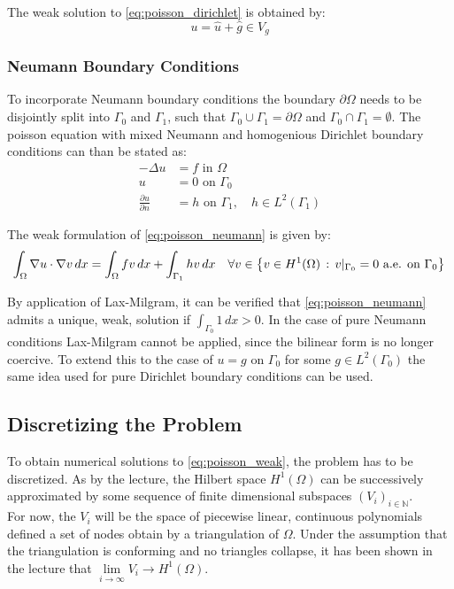 \documentclass[11pt,a4paper]{article}
\begin{document}
The weak solution to \ref{eq:poisson_dirichlet} is obtained by:
$$u = \hat{u} + \hat{g} \in V_g$$

\subsubsection*{Neumann Boundary Conditions}
To incorporate Neumann boundary conditions the boundary $\partial\Omega$ needs
to be disjointly split into $\Gamma_0$ and $\Gamma_1$, such that
$\Gamma_0 \cup \Gamma_1 = \partial\Omega$ and $\Gamma_0 \cap \Gamma_1 = \emptyset$.
The poisson equation with mixed Neumann and homogenious Dirichlet boundary
conditions can than be stated as:
\begin{equation} \label{eq:poisson_neumann}
  \begin{split}
    -\Delta u &= f  \text{ in } \Omega \\
    u &= 0 \text{ on } \Gamma_0 \\
    \frac{\partial u}{\partial n} &= h \text{ on } \Gamma_1, \quad h\in L^2(\Gamma_1)
  \end{split}
\end{equation}

The weak formulation of \ref{eq:poisson_neumann} is given by:
\begin{equation}
  \int_\Omega \nabla u \cdot \nabla v\,dx
  = \int_\Omega fv\,dx + \int_{\Gamma_1}hv\,dx \quad
  \forall v \in \left\{ v \in H^1(\Omega)\, :\, v\vert_{\Gamma_0} = 0 \text{ a.e. on } \Gamma_0\right\}\\
\end{equation}

By application of Lax-Milgram, it can be verified that \ref{eq:poisson_neumann}
admits a unique, weak, solution if $\int_{\Gamma_0}1\,dx > 0$.
In the case of pure Neumann conditions Lax-Milgram cannot be applied, since the
bilinear form is no longer coercive. To extend this to the case of $u = g$ on
$\Gamma_0$ for some $g \in L^2(\Gamma_0)$ the same idea used for pure Dirichlet
boundary conditions can be used.

\subsection*{Discretizing the Problem}
To obtain numerical solutions to \ref{eq:poisson_weak}, the problem has to be
discretized. As by the lecture, the Hilbert space $H^1(\Omega)$ can be
successively approximated by some sequence of finite dimensional subspaces
$(V_i)_{i\in \mathbb{N}}$.\\
For now, the $V_i$ will be the space of piecewise linear, continuous
polynomials defined a set of nodes obtain by a triangulation of $\Omega$.
Under the assumption that the triangulation is conforming and no triangles
collapse, it has been shown in the lecture that $\lim\limits_{i\to\infty}V_i \to
H^1(\Omega)$.
\end{document}
